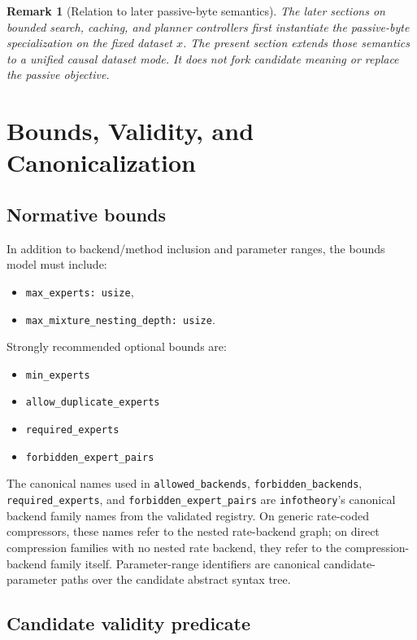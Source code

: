 \documentclass[11pt]{article}
\newtheorem{remark}{Remark}
\begin{document}
\begin{remark}[Relation to later passive-byte semantics]
The later sections on bounded search, caching, and planner controllers first
instantiate the passive-byte specialization on the fixed dataset $x$. The
present section extends those semantics to a unified causal dataset mode. It
does not fork candidate meaning or replace the passive objective.
\end{remark}

\section{Bounds, Validity, and Canonicalization}

\subsection{Normative bounds}

In addition to backend/method inclusion and parameter ranges, the bounds model must include:
\begin{itemize}
    \item \texttt{max\_experts: usize},
    \item \texttt{max\_mixture\_nesting\_depth: usize}.
\end{itemize}

Strongly recommended optional bounds are:
\begin{itemize}
    \item \texttt{min\_experts}
    \item \texttt{allow\_duplicate\_experts}
    \item \texttt{required\_experts}
    \item \texttt{forbidden\_expert\_pairs}
\end{itemize}

The canonical names used in \texttt{allowed\_backends},
\texttt{forbidden\_backends}, \texttt{required\_experts}, and
\texttt{forbidden\_expert\_pairs} are \texttt{infotheory}'s canonical backend
family names from the validated registry. On generic rate-coded compressors,
these names refer to the nested rate-backend graph; on direct compression
families with no nested rate backend, they refer to the compression-backend
family itself. Parameter-range identifiers are canonical candidate-parameter
paths over the candidate abstract syntax tree.

\subsection{Candidate validity predicate}
\end{document}
